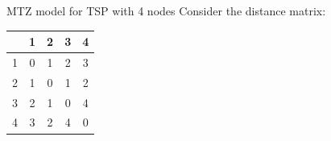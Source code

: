 \begin{example}{MTZ model for TSP with 4 nodes}{}
Consider the distance matrix:
\begin{center}
\begin{tabular}{|c|c|c|c|c|}
\hline
 & 1 & 2 & 3 & 4 \\
\hline
1 & 0 & 1 & 2 & 3 \\
\hline
2 & 1 & 0 & 1 & 2 \\
\hline
3 & 2 & 1 & 0 & 4 \\
\hline
4 & 3 & 2 & 4 & 0 \\
\hline
\end{tabular}
\par{}\label{tab:integerProgrammingExponentialFormulations-tab03}%

\end{center}


\end{example}
